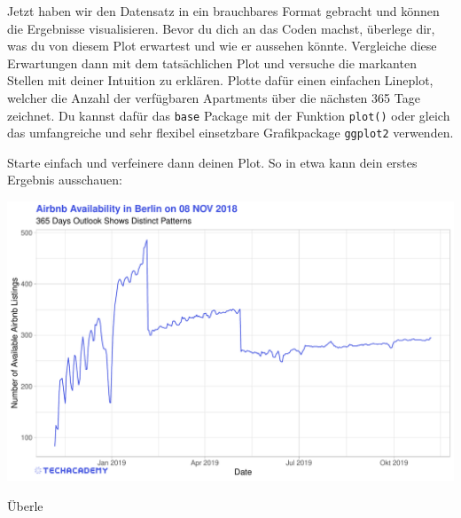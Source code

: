 \documentclass[
]{book}
\begin{document}
Jetzt haben wir den Datensatz in ein brauchbares Format gebracht und können die Ergebnisse visualisieren.
Bevor du dich an das Coden machst, überlege dir, was du von diesem Plot erwartest und wie er aussehen könnte.
Vergleiche diese Erwartungen dann mit dem tatsächlichen Plot und versuche die markanten Stellen mit deiner Intuition zu erklären.
Plotte dafür einen einfachen Lineplot, welcher die Anzahl der verfügbaren Apartments über die nächsten 365 Tage zeichnet.
Du kannst dafür das \texttt{base} Package mit der Funktion \texttt{plot()} oder gleich das umfangreiche und sehr flexibel einsetzbare Grafikpackage \texttt{ggplot2} verwenden.

Starte einfach und verfeinere dann deinen Plot.
So in etwa kann dein erstes Ergebnis ausschauen:

\includegraphics[width=1\linewidth,height=500   extheight]{plots/1_3_AvailabilityOutlook}

Überle
\end{document}
